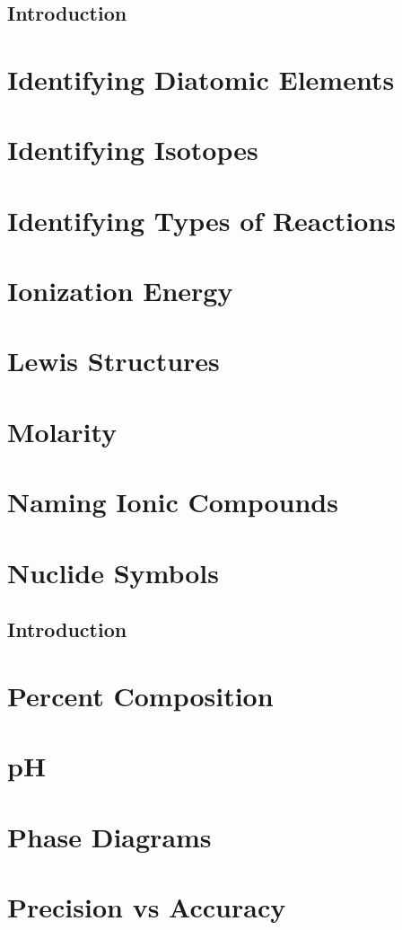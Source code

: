 \documentclass[10pt, roman]{article}
\begin{document}
\subsection*{Introduction}
\section{Identifying Diatomic Elements}
\section{Identifying Isotopes}
\section{Identifying Types of Reactions}
\section{Ionization Energy}
\section{Lewis Structures}
\section{Molarity}
\section{Naming Ionic Compounds}
\section{Nuclide Symbols}
\subsection*{Introduction}
\section{Percent Composition}
\section{pH}
\section{Phase Diagrams}
\section{Precision vs Accuracy}
\end{document}
